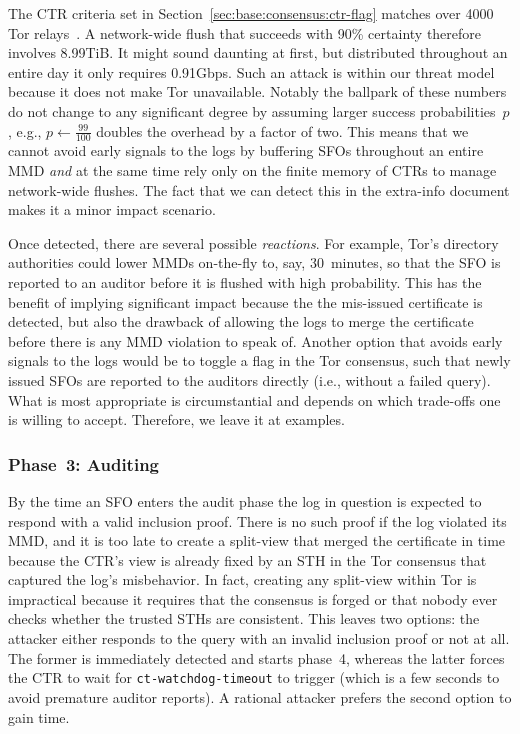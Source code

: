 The CTR criteria set in Section~\ref{sec:base:consensus:ctr-flag} matches over
4000 Tor relays~\cite{relay-by-flag}.  A network-wide flush that succeeds with
90\% certainty therefore involves 8.99TiB.  It might sound daunting at
first, but distributed throughout an entire day it only requires
0.91Gbps.
Such an attack is within our threat model because it does not make Tor
unavailable.  Notably the ballpark of these numbers do not change to any
significant degree by assuming larger success probabilities~$p$, e.g.,
$p\gets\frac{99}{100}$ doubles the overhead by a factor of two.  This means that
we cannot avoid early signals to the logs by buffering SFOs throughout an entire
MMD \emph{and} at the same time rely only on the finite memory of CTRs to manage
network-wide flushes.  The fact that we can detect this in the extra-info
document makes it a minor impact scenario.

Once detected, there are several possible \emph{reactions}.  For example, Tor's
directory authorities could lower MMDs on-the-fly to, say, 30~minutes, so that
the SFO is reported to an auditor before it is flushed with high
probability.  This has the benefit of implying significant impact because the
the mis-issued certificate is detected, but also the drawback of allowing the
logs to merge the certificate before there is any MMD violation to speak of.
Another option that avoids early signals to the logs would be to toggle a
flag in the Tor consensus, such that newly issued SFOs are reported to the
auditors directly (i.e., without a failed query).  What is most appropriate
is circumstantial and depends on which trade-offs one is willing to accept.
Therefore, we leave it at examples.

\subsubsection{Phase~3: Auditing} \label{sec:analysis:pr:phase3}
By the time an SFO enters the audit phase the log in question is expected to
respond with a valid inclusion proof.  There is no such proof if the log
violated its MMD, and it is too late to create a split-view that merged the
certificate in time because the CTR's view is already fixed by an STH in the
Tor consensus that captured the log's misbehavior.  In fact, creating any
split-view within Tor is impractical because it requires that the consensus is
forged or that nobody ever checks whether the trusted STHs are consistent.
This leaves two options:
	the attacker either responds to the query with an invalid inclusion proof or
	not at all.
The former is immediately detected and starts phase~4, whereas the latter forces
the CTR to wait for \texttt{ct-watchdog-timeout} to trigger (which is a
few seconds to avoid premature auditor reports).  A rational attacker prefers
the second option to gain time.

